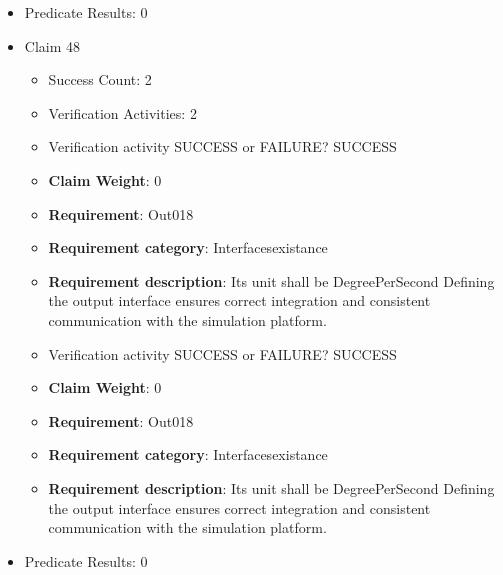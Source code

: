 \documentclass{article}
\begin{document}
\begin{itemize}
\begin{itemize}
					\item Verification activity SUCCESS or FAILURE? SUCCESS
					\item \textbf{Claim Weight}: 0
						\item \textbf{Requirement}: Out017 
						\item \textbf{Requirement category}: Interfacesexistance 
						\item \textbf{Requirement description}: Its unit shall be Degree Defining the output interface ensures correct integration and consistent communication with the simulation platform.
					
				\end{itemize}
				
									    
				\item Predicate Results: 0

  				  \item Claim 48
				\begin{itemize}
			    	\item Success Count: 2 
			    	\item Verification Activities: 2
					\item Verification activity SUCCESS or FAILURE? SUCCESS
					\item \textbf{Claim Weight}: 0
						\item \textbf{Requirement}: Out018 
						\item \textbf{Requirement category}: Interfacesexistance 
						\item \textbf{Requirement description}: Its unit shall be DegreePerSecond Defining the output interface ensures correct integration and consistent communication with the simulation platform.
					
					\item Verification activity SUCCESS or FAILURE? SUCCESS
					\item \textbf{Claim Weight}: 0
						\item \textbf{Requirement}: Out018 
						\item \textbf{Requirement category}: Interfacesexistance 
						\item \textbf{Requirement description}: Its unit shall be DegreePerSecond Defining the output interface ensures correct integration and consistent communication with the simulation platform.
					
				\end{itemize}
				
									    
				\item Predicate Results: 0


\end{itemize}
\end{document}
